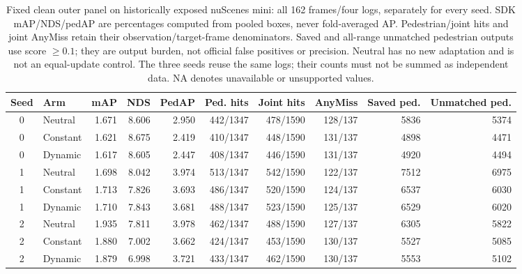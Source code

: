 \begin{table}[t]
\centering
\footnotesize
\setlength{\tabcolsep}{3.3pt}
\caption{Fixed clean outer panel on historically exposed nuScenes mini: all 162 frames/four logs, separately for every seed. SDK mAP/NDS/pedAP are percentages computed from pooled boxes, never fold-averaged AP. Pedestrian/joint hits and joint AnyMiss retain their observation/target-frame denominators. Saved and all-range unmatched pedestrian outputs use score $\geq0.1$; they are output burden, not official false positives or precision. Neutral has no new adaptation and is not an equal-update control. The three seeds reuse the same logs; their counts must not be summed as independent data. NA denotes unavailable or unsupported values.}
\label{tab:new_main_clean}
\begin{tabular}{clrrrrrrrr}
\toprule
Seed & Arm & mAP & NDS & PedAP & Ped. hits & Joint hits & AnyMiss & Saved ped. & Unmatched ped. \\
\midrule
0 & Neutral & 1.671 & 8.606 & 2.950 & 442/1347 & 478/1590 & 128/137 & 5836 & 5374 \\
0 & Constant & 1.621 & 8.675 & 2.419 & 410/1347 & 448/1590 & 131/137 & 4898 & 4471 \\
0 & Dynamic & 1.617 & 8.605 & 2.447 & 408/1347 & 446/1590 & 131/137 & 4920 & 4494 \\
1 & Neutral & 1.698 & 8.042 & 3.974 & 513/1347 & 542/1590 & 122/137 & 7512 & 6975 \\
1 & Constant & 1.713 & 7.826 & 3.693 & 486/1347 & 520/1590 & 124/137 & 6537 & 6030 \\
1 & Dynamic & 1.710 & 7.843 & 3.681 & 488/1347 & 523/1590 & 125/137 & 6529 & 6020 \\
2 & Neutral & 1.935 & 7.811 & 3.978 & 462/1347 & 488/1590 & 127/137 & 6305 & 5822 \\
2 & Constant & 1.880 & 7.002 & 3.662 & 424/1347 & 453/1590 & 130/137 & 5527 & 5085 \\
2 & Dynamic & 1.879 & 6.998 & 3.721 & 433/1347 & 462/1590 & 130/137 & 5553 & 5102 \\
\bottomrule
\end{tabular}
\end{table}
